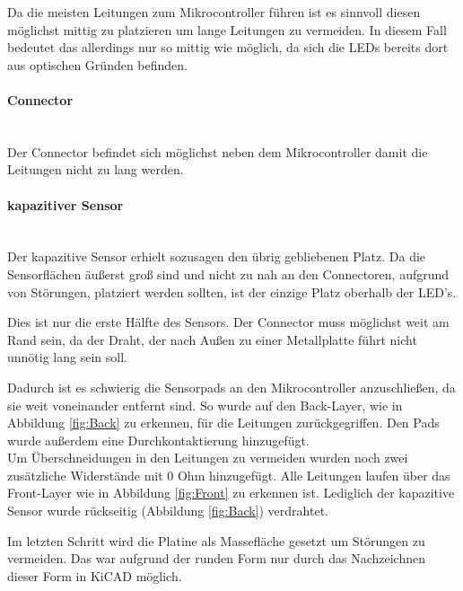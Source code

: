 \documentclass[a4paper,
DIV=13,
12pt,
BCOR=10mm,
department=FakEI,
parskip=half,
automark,
]{article}
\begin{document}
Da die meisten Leitungen zum Mikrocontroller führen ist es sinnvoll diesen möglichst mittig zu platzieren um lange Leitungen zu vermeiden. In diesem Fall bedeutet das allerdings nur so mittig wie möglich, da sich die LEDs bereits dort aus optischen Gründen befinden. 

\paragraph{Connector} $~$ \\

Der Connector befindet sich möglichst neben dem Mikrocontroller damit die Leitungen nicht zu lang werden.

\paragraph{kapazitiver Sensor} $~$ \\

Der kapazitive Sensor erhielt sozusagen den übrig gebliebenen Platz. Da die Sensorflächen äußerst groß sind und nicht zu nah an den Connectoren, aufgrund von Störungen, platziert werden sollten, ist der einzige Platz oberhalb der LED's. 

Dies ist nur die erste Hälfte des Sensors. Der Connector muss möglichst weit am Rand sein, da der Draht, der nach Außen zu einer Metallplatte führt nicht unnötig lang sein soll. 

Dadurch ist es schwierig die Sensorpads an den Mikrocontroller anzuschließen, da sie weit voneinander entfernt sind. So wurde auf den Back-Layer, wie in Abbildung \ref{fig:Back} zu erkennen, für die Leitungen zurückgegriffen. Den Pads wurde außerdem eine Durchkontaktierung hinzugefügt.\\


Um Überschneidungen in den Leitungen zu vermeiden wurden noch zwei zusätzliche Widerstände mit 0 Ohm hinzugefügt. Alle Leitungen laufen über das Front-Layer wie in Abbildung \ref{fig:Front} zu erkennen ist. Lediglich der kapazitive Sensor wurde rückseitig (Abbildung \ref{fig:Back}) verdrahtet. 

Im letzten Schritt wird die Platine als Massefläche gesetzt um Störungen zu vermeiden. Das war aufgrund der runden Form nur durch das Nachzeichnen dieser Form in KiCAD möglich. 
\end{document}
